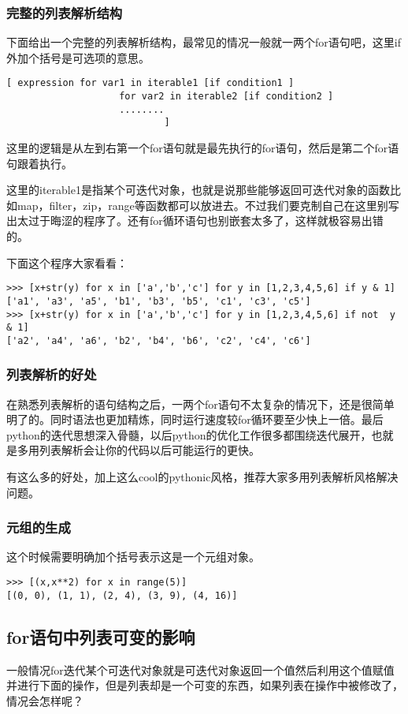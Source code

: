 \documentclass[12pt,oneside]{book}
\begin{document}
\begin{common-format}
\subsubsection{完整的列表解析结构}
下面给出一个完整的列表解析结构，最常见的情况一般就一两个for语句吧，这里if外加个括号是可选项的意思。
\begin{Verbatim}
[ expression for var1 in iterable1 [if condition1 ]
                    for var2 in iterable2 [if condition2 ]
                    ........
                            ]
\end{Verbatim}

这里的逻辑是从左到右第一个for语句就是最先执行的for语句，然后是第二个for语句跟着执行。

这里的iterable1是指某个可迭代对象，也就是说那些能够返回可迭代对象的函数比如map，filter，zip，range等函数都可以放进去。不过我们要克制自己在这里别写出太过于晦涩的程序了。还有for循环语句也别嵌套太多了，这样就极容易出错的。

下面这个程序大家看看：
\begin{Verbatim}
>>> [x+str(y) for x in ['a','b','c'] for y in [1,2,3,4,5,6] if y & 1]
['a1', 'a3', 'a5', 'b1', 'b3', 'b5', 'c1', 'c3', 'c5']
>>> [x+str(y) for x in ['a','b','c'] for y in [1,2,3,4,5,6] if not  y & 1]
['a2', 'a4', 'a6', 'b2', 'b4', 'b6', 'c2', 'c4', 'c6']
\end{Verbatim}

\subsubsection{列表解析的好处}
在熟悉列表解析的语句结构之后，一两个for语句不太复杂的情况下，还是很简单明了的。同时语法也更加精炼，同时运行速度较for循环要至少快上一倍。最后python的迭代思想深入骨髓，以后python的优化工作很多都围绕迭代展开，也就是多用列表解析会让你的代码以后可能运行的更快。

有这么多的好处，加上这么cool的pythonic风格，推荐大家多用列表解析风格解决问题。


\subsubsection{元组的生成}
这个时候需要明确加个括号表示这是一个元组对象。
\begin{Verbatim}
>>> [(x,x**2) for x in range(5)]
[(0, 0), (1, 1), (2, 4), (3, 9), (4, 16)]
\end{Verbatim}



\subsection{for语句中列表可变的影响}
一般情况for迭代某个可迭代对象就是可迭代对象返回一个值然后利用这个值赋值并进行下面的操作，但是列表却是一个可变的东西，如果列表在操作中被修改了，情况会怎样呢？


\end{common-format}
\end{document}
